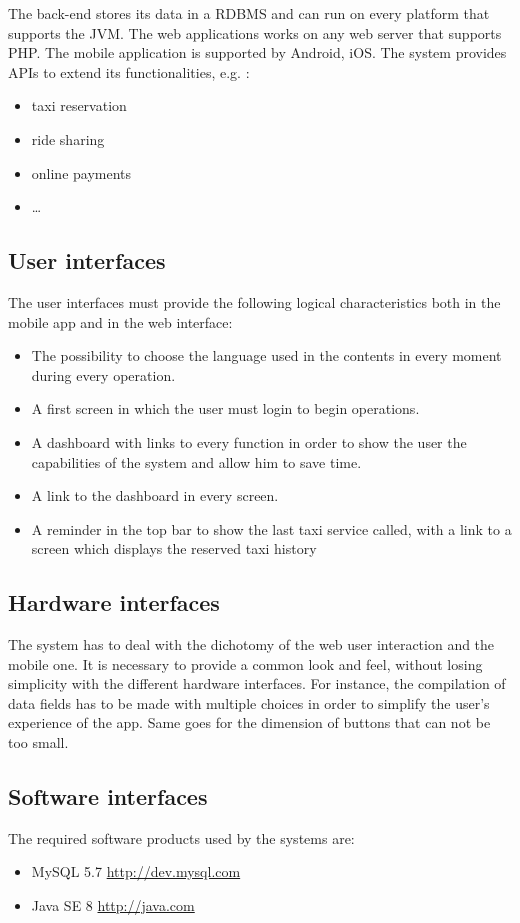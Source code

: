 The back-end stores its data in a RDBMS and  can run on every platform that supports the JVM.
The web applications works on any web server that supports PHP. The mobile application is supported by Android, iOS. The system provides APIs to extend its functionalities, e.g. :
\begin{itemize}
\item taxi reservation
\item ride sharing
\item online payments
\item \ldots
\end{itemize}


\subsection{User interfaces}
The user interfaces must provide the following logical characteristics both in the mobile app and in the web interface:
\begin{itemize}
\item The possibility to choose the language used in the contents in every moment during every operation.
\item A first screen in which the user must login to begin operations.
\item A dashboard with links to every function in order to show the user the capabilities of the system and allow him to save time. 
\item A link to the dashboard in every screen.
\item A reminder in the top bar to show the last taxi service called, with a link to a screen which displays the reserved taxi history 
\end{itemize}

\subsection{Hardware interfaces} 
The system has to deal with the dichotomy of the web user interaction and the mobile one. It is necessary to provide a common look and feel, without losing simplicity with the different hardware interfaces. For instance, the compilation of data fields has to be made with multiple choices in order to simplify the user's experience of the app. Same goes for the dimension of buttons that can not be too small.

\subsection{Software interfaces}
The required software products used by the systems are:
\begin{itemize}
\item MySQL 5.7   \url{http://dev.mysql.com}
\item Java SE 8   \url{http://java.com}
\end{itemize}
